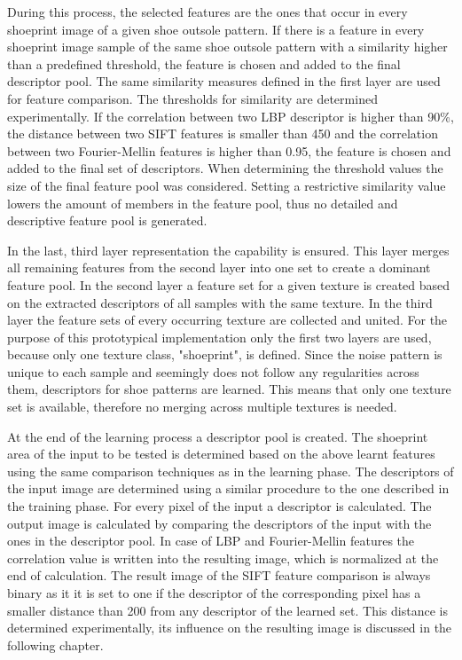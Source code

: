 \documentclass[draft,final]{vutinfth} %
\begin{document}
During this process, the selected features are the ones that occur in every shoeprint image of a given shoe outsole pattern.
If there is a feature in every shoeprint image sample of the same shoe outsole pattern with a similarity higher than a predefined threshold, the feature is chosen and added to the final descriptor pool. 
The same similarity measures defined in the first layer are used for feature comparison.
The thresholds for similarity are determined experimentally.
If the correlation between two LBP descriptor is higher than 90\%, the distance between two SIFT features is smaller than 450 and the correlation between two Fourier-Mellin features is higher than 0.95, the feature is chosen and added to the final set of descriptors.
When determining the threshold values the size of the final feature pool was considered. 
Setting a restrictive similarity value lowers the amount of members in the feature pool, thus no detailed and descriptive feature pool is generated. 
\par
In the last, third layer representation the capability is ensured.
This layer merges all remaining features from the second layer into one set to create a dominant feature pool.
In the second layer a feature set for a given texture is created based on the extracted descriptors of all samples with the same texture.
In the third layer the feature sets of every occurring texture are collected and united.
For the purpose of this prototypical implementation only the first two layers are used, because only one texture class, "shoeprint", is defined.
Since the noise pattern is unique to each sample and seemingly does not follow any regularities across them, descriptors for shoe patterns are learned.
This means that only one texture set is available, therefore no merging across multiple textures is needed.
\par
At the end of the learning process a descriptor pool is created.
The shoeprint area of the input to be tested is determined based on the above learnt features using the same comparison techniques as in the learning phase.
The descriptors of the input image are determined using a similar procedure to the one described in the training phase.
For every pixel of the input a descriptor is calculated.
The output image is calculated by comparing the descriptors of the input with the ones in the descriptor pool.
In case of LBP and Fourier-Mellin features the correlation value is written into the resulting image, which is normalized at the end of calculation.
The result image of the SIFT feature comparison is always binary as it it is set to one if the descriptor of the corresponding pixel has a smaller distance than 200 from any descriptor of the learned set. 
This distance is determined experimentally, its influence on the resulting image is discussed in the following chapter.
\end{document}
